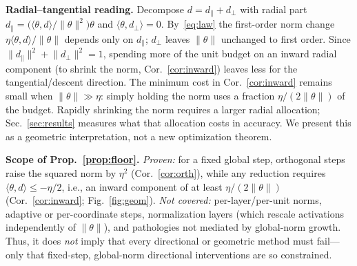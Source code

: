 \documentclass[conference]{IEEEtran}
\begin{document}
\noindent\textbf{Radial--tangential reading.} Decompose $d=d_{\parallel}+d_{\perp}$
with radial part
$d_{\parallel}=\big(\langle\theta,d\rangle/\lVert\theta\rVert^{2}\big)\theta$ and
$\langle\theta,d_{\perp}\rangle=0$. By~\eqref{eq:law} the first-order norm change
$\eta\langle\theta,d\rangle/\lVert\theta\rVert$ depends only on $d_{\parallel}$;
$d_{\perp}$ leaves $\lVert\theta\rVert$ unchanged to first order. Since
$\lVert d_{\parallel}\rVert^{2}+\lVert d_{\perp}\rVert^{2}=1$, spending more of the
unit budget on an inward radial component (to shrink the norm,
Cor.~\ref{cor:inward}) leaves less for the tangential/descent direction. The
minimum cost in Cor.~\ref{cor:inward} remains small when $\lVert\theta\rVert\gg\eta$:
simply holding the norm uses a fraction $\eta/(2\lVert\theta\rVert)$ of the budget.
Rapidly shrinking the norm requires a larger radial allocation;
Sec.~\ref{sec:results} measures what that allocation costs in accuracy. We present
this as a geometric interpretation, not a new optimization theorem.

\noindent\textbf{Scope of Prop.~\ref{prop:floor}.} {\emph{Proven:} for a fixed
global step, orthogonal steps raise the squared norm by $\eta^{2}$
(Cor.~\ref{cor:orth}), while any reduction requires
$\langle\theta,d\rangle\le-\eta/2$, i.e., an inward component of at least
$\eta/(2\lVert\theta\rVert)$ (Cor.~\ref{cor:inward}; Fig.~\ref{fig:geom}).}
\emph{Not covered:}
per-layer/per-unit norms, adaptive or per-coordinate steps, normalization layers
(which rescale activations independently of $\lVert\theta\rVert$), and pathologies
not mediated by global-norm growth. Thus, it does \emph{not} imply that every
directional or geometric method must fail---only that fixed-step, global-norm
directional interventions are so constrained.
\end{document}
